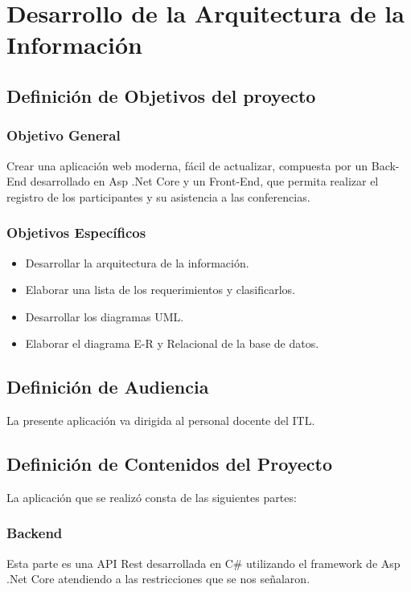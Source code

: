 \chapter{Desarrollo de la Arquitectura de la Información}

\section{Definición de Objetivos del proyecto}
\subsection{Objetivo General}

Crear una aplicación web moderna, fácil de actualizar, compuesta por un Back-End desarrollado en Asp .Net Core y un Front-End, que permita realizar el registro de los participantes y su asistencia a las conferencias.

\subsection{Objetivos Específicos}
 
\begin{itemize}
	\item Desarrollar la arquitectura de la información.
	\item Elaborar una lista de los requerimientos y clasificarlos.
	\item Desarrollar los diagramas UML.
	\item Elaborar el diagrama E-R y Relacional de la base de datos.
\end{itemize}

\section{Definición de Audiencia}
La presente aplicación va dirigida al personal docente del ITL.

\section{Definición de Contenidos del Proyecto}
La aplicación que se realizó consta de las siguientes partes:
\subsection{Backend}
	Esta parte es una API Rest desarrollada en C\# utilizando el framework de Asp .Net Core atendiendo a las restricciones que se nos señalaron. 
	
